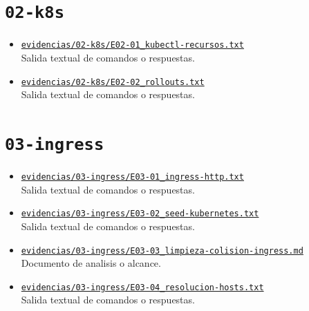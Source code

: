 \section{\texorpdfstring{\nolinkurl{02-k8s}}{02-k8s}}
\begin{itemize}[leftmargin=1.2em]
  \item \href{https://github.com/gamurigm/inventrack-ptes-report/blob/main/evidencias/02-k8s/E02-01_kubectl-recursos.txt}{\nolinkurl{evidencias/02-k8s/E02-01_kubectl-recursos.txt}}\\
  {\small Salida textual de comandos o respuestas.}
  \item \href{https://github.com/gamurigm/inventrack-ptes-report/blob/main/evidencias/02-k8s/E02-02_rollouts.txt}{\nolinkurl{evidencias/02-k8s/E02-02_rollouts.txt}}\\
  {\small Salida textual de comandos o respuestas.}
\end{itemize}

\section{\texorpdfstring{\nolinkurl{03-ingress}}{03-ingress}}
\begin{itemize}[leftmargin=1.2em]
  \item \href{https://github.com/gamurigm/inventrack-ptes-report/blob/main/evidencias/03-ingress/E03-01_ingress-http.txt}{\nolinkurl{evidencias/03-ingress/E03-01_ingress-http.txt}}\\
  {\small Salida textual de comandos o respuestas.}
  \item \href{https://github.com/gamurigm/inventrack-ptes-report/blob/main/evidencias/03-ingress/E03-02_seed-kubernetes.txt}{\nolinkurl{evidencias/03-ingress/E03-02_seed-kubernetes.txt}}\\
  {\small Salida textual de comandos o respuestas.}
  \item \href{https://github.com/gamurigm/inventrack-ptes-report/blob/main/evidencias/03-ingress/E03-03_limpieza-colision-ingress.md}{\nolinkurl{evidencias/03-ingress/E03-03_limpieza-colision-ingress.md}}\\
  {\small Documento de analisis o alcance.}
  \item \href{https://github.com/gamurigm/inventrack-ptes-report/blob/main/evidencias/03-ingress/E03-04_resolucion-hosts.txt}{\nolinkurl{evidencias/03-ingress/E03-04_resolucion-hosts.txt}}\\
  {\small Salida textual de comandos o respuestas.}
\end{itemize}


